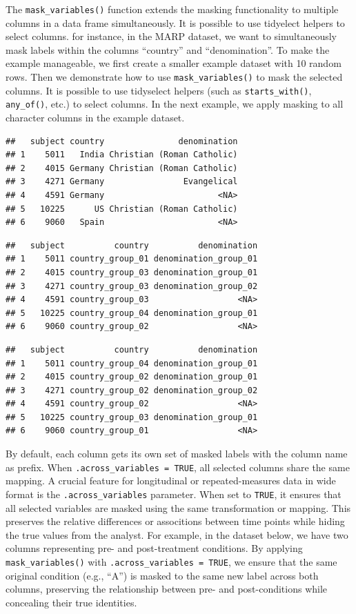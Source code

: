 \documentclass[
  english,
  man,floatsintext]{apa6}
\begin{document}
The \texttt{mask\_variables()} function extends the masking functionality to multiple columns in a data frame simultaneously. It is possible to use tidyelect helpers to select columns. for instance, in the MARP dataset, we want to simultaneously mask labels within the columns ``country'' and ``denomination''. To make the example manageable, we first create a smaller example dataset with 10 random rows. Then we demonstrate how to use \texttt{mask\_variables()} to mask the selected columns. It is possible to use tidyselect helpers (such as \texttt{starts\_with()}, \texttt{any\_of()}, etc.) to select columns. In the next example, we apply masking to all character columns in the example dataset.

\begin{verbatim}
##   subject country               denomination
## 1    5011   India Christian (Roman Catholic)
## 2    4015 Germany Christian (Roman Catholic)
## 3    4271 Germany                Evangelical
## 4    4591 Germany                       <NA>
## 5   10225      US Christian (Roman Catholic)
## 6    9060   Spain                       <NA>
\end{verbatim}

\begin{verbatim}
##   subject          country          denomination
## 1    5011 country_group_01 denomination_group_01
## 2    4015 country_group_03 denomination_group_01
## 3    4271 country_group_03 denomination_group_02
## 4    4591 country_group_03                  <NA>
## 5   10225 country_group_04 denomination_group_01
## 6    9060 country_group_02                  <NA>
\end{verbatim}

\begin{verbatim}
##   subject          country          denomination
## 1    5011 country_group_04 denomination_group_01
## 2    4015 country_group_02 denomination_group_01
## 3    4271 country_group_02 denomination_group_02
## 4    4591 country_group_02                  <NA>
## 5   10225 country_group_03 denomination_group_01
## 6    9060 country_group_01                  <NA>
\end{verbatim}

By default, each column gets its own set of masked labels with the column name as prefix. When \texttt{.across\_variables\ =\ TRUE}, all selected columns share the same mapping. A crucial feature for longitudinal or repeated-measures data in wide format is the \texttt{.across\_variables} parameter. When set to \texttt{TRUE}, it ensures that all selected variables are masked using the same transformation or mapping. This preserves the relative differences or associtions between time points while hiding the true values from the analyst. For example, in the dataset below, we have two columns representing pre- and post-treatment conditions. By applying \texttt{mask\_variables()} with \texttt{.across\_variables\ =\ TRUE}, we ensure that the same original condition (e.g., ``A'') is masked to the same new label across both columns, preserving the relationship between pre- and post-conditions while concealing their true identities.
\end{document}
